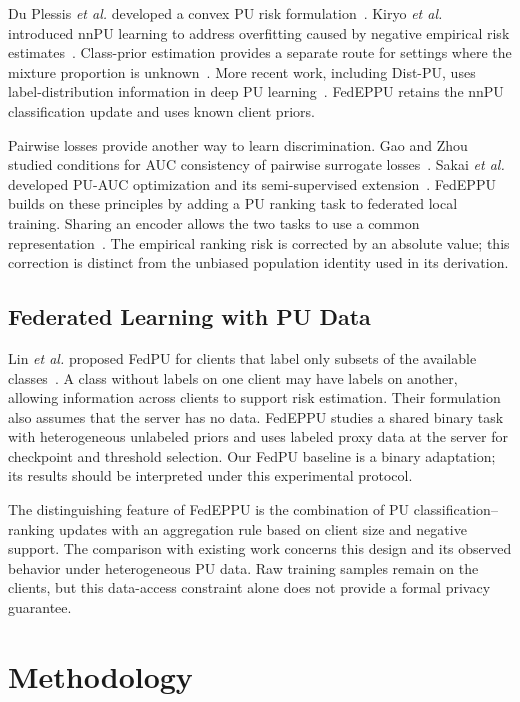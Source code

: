 \documentclass[lettersize,journal]{IEEEtran}
\begin{document}
Du Plessis \emph{et al.} developed a convex PU risk formulation~\cite{ref_pu}. Kiryo \emph{et al.} introduced nnPU learning to address overfitting caused by negative empirical risk estimates~\cite{ref_nnpu}. Class-prior estimation provides a separate route for settings where the mixture proportion is unknown~\cite{ref_prior_estimation}. More recent work, including Dist-PU, uses label-distribution information in deep PU learning~\cite{ref_distpu}. FedEPPU retains the nnPU classification update and uses known client priors.

Pairwise losses provide another way to learn discrimination. Gao and Zhou studied conditions for AUC consistency of pairwise surrogate losses~\cite{ref_auc_consistency}. Sakai \emph{et al.} developed PU-AUC optimization and its semi-supervised extension~\cite{ref_puauc}. FedEPPU builds on these principles by adding a PU ranking task to federated local training. Sharing an encoder allows the two tasks to use a common representation~\cite{ref_multitask}. The empirical ranking risk is corrected by an absolute value; this correction is distinct from the unbiased population identity used in its derivation.

\subsection{Federated Learning with PU Data}

Lin \emph{et al.} proposed FedPU for clients that label only subsets of the available classes~\cite{ref_fedpu}. A class without labels on one client may have labels on another, allowing information across clients to support risk estimation. Their formulation also assumes that the server has no data. FedEPPU studies a shared binary task with heterogeneous unlabeled priors and uses labeled proxy data at the server for checkpoint and threshold selection. Our FedPU baseline is a binary adaptation; its results should be interpreted under this experimental protocol.

The distinguishing feature of FedEPPU is the combination of PU classification--ranking updates with an aggregation rule based on client size and negative support. The comparison with existing work concerns this design and its observed behavior under heterogeneous PU data. Raw training samples remain on the clients, but this data-access constraint alone does not provide a formal privacy guarantee.

\section{Methodology}
\label{sec:methodology}
\end{document}
